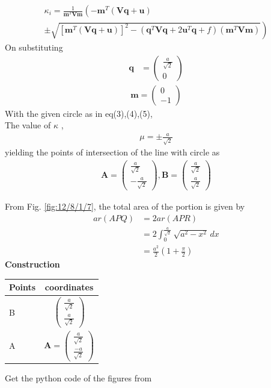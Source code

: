 \documentclass[10pt,a4paper]{report}
\newcommand{\myvec}[1]{\ensuremath{\begin{pmatrix}#1\end{pmatrix}}}
\let\vec\mathbf
\let\vec\mathbf
\providecommand{\brak}[1]{\ensuremath{\left(#1\right)}}
\providecommand{\lbrak}[1]{\ensuremath{\left(#1\right.}}
\providecommand{\rbrak}[1]{\ensuremath{\left.#1\right)}}
\providecommand{\sbrak}[1]{\ensuremath{{}\left[#1\right]}}
\begin{document}
\begin{multicols}{2}
{\begin{multline}
\kappa_i = \frac{1}
{
\vec{m}^T\vec{V}\vec{m}
}
\lbrak{-\vec{m}^T\brak{\vec{V}\vec{q}+\vec{u}}}
\\
\pm
\rbrak{\sqrt{
\sbrak{
\vec{m}^T\brak{\vec{V}\vec{q}+\vec{u}}
}^2
-
\brak
{
\vec{q}^T\vec{V}\vec{q} + 2\vec{u}^T\vec{q} +f
}
\brak{\vec{m}^T\vec{V}\vec{m}}
}
}
\end{multline}
}
On substituting\\
\begin{align}
\vec{q} &= \myvec{
\frac{a}{\sqrt{2}}\\
0
} 
\end{align}
\begin{align}
\vec{m} = \myvec{ 0 \\ -1 }
\end{align}
With the given circle  as in eq(3),(4),(5),\\ 

The value of $\kappa$ ,\\
\fi
\begin{align}
    \mu =\pm\frac{a}{\sqrt{2}}
\end{align}
yielding the
points of intersection of the line with circle as
\begin{align}
    \vec{A}=\myvec{
\frac{a}{\sqrt{2}}\\
-\frac{a}{\sqrt{2}}
    },
    \vec{B}=\myvec{
\frac{a}{\sqrt{2}}\\
\frac{a}{\sqrt{2}}
    }
\end{align}

 From Fig.
		\ref{fig:12/8/1/7},
the total area of the portion is given by
\begin{align}
	ar( APQ)&=2 ar (APR)
	\\
&=2\int_{0}^{\frac{a}{\sqrt{2}}}\sqrt{a^2-x^2}\,dx 
	\\
	&=\frac{a^2}{2}\brak{1+\frac{\pi}{2}}
\end{align}
	\iffalse
 \vspace{2mm} \textbf{Construction}
\begin{center}
\setlength{\arrayrulewidth}{0.5mm}
\setlength{\tabcolsep}{6pt}
\renewcommand{\arraystretch}{1.5}
    \begin{tabular}{|l|c|}
    \hline 
    \textbf{Points} & \textbf{coordinates} \\ \hline
   B & $\myvec{
\frac{a}{\sqrt{2}}\\
\frac{a}{\sqrt{2}}
   } $ \\\hline
   A & $
   \vec{A}=\myvec{
\frac{a}{\sqrt{2}}\\
\frac{-a}{\sqrt{2}}
   } $ 
   \\\hline
      \end{tabular}
  \end{center}
  \end{multicols}
 
Get the python code of the figures from

\begin{table}[h]
\large
\centering
{}

\end{table} 
\end{document}
